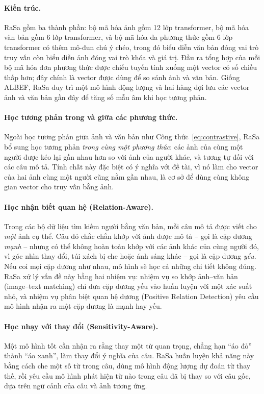 \paragraph{Kiến trúc.} RaSa gồm ba thành phần: bộ mã hóa ảnh gồm 12 lớp transformer, bộ mã hóa văn bản gồm 6 lớp transformer, và bộ mã hóa đa phương thức gồm 6 lớp transformer có thêm mô-đun chú ý chéo, trong đó biểu diễn văn bản đóng vai trò truy vấn còn biểu diễn ảnh đóng vai trò khóa và giá trị. Đầu ra tổng hợp của mỗi bộ mã hóa đơn phương thức được chiếu tuyến tính xuống một vector có số chiều thấp hơn; đây chính là vector được dùng để so sánh ảnh và văn bản. Giống ALBEF, RaSa duy trì một mô hình động lượng và hai hàng đợi lưu các vector ảnh và văn bản gần đây để tăng số mẫu âm khi học tương phản.

\paragraph{Học tương phản trong và giữa các phương thức.} Ngoài học tương phản giữa ảnh và văn bản như Công thức~\ref{eq:contrastive}, RaSa bổ sung học tương phản \emph{trong cùng một phương thức}: các ảnh của cùng một người được kéo lại gần nhau hơn so với ảnh của người khác, và tương tự đối với các câu mô tả. Tính chất này đặc biệt có ý nghĩa với đề tài, vì nó làm cho vector của hai ảnh cùng một người cũng nằm gần nhau, là cơ sở để dùng cùng không gian vector cho truy vấn bằng ảnh.

\paragraph{Học nhận biết quan hệ (Relation-Aware).} Trong các bộ dữ liệu tìm kiếm người bằng văn bản, mỗi câu mô tả được viết cho \emph{một} ảnh cụ thể. Câu đó chắc chắn khớp với ảnh được mô tả -- gọi là cặp dương \emph{mạnh} -- nhưng có thể không hoàn toàn khớp với các ảnh khác của cùng người đó, vì góc nhìn thay đổi, túi xách bị che hoặc ánh sáng khác -- gọi là cặp dương \emph{yếu}. Nếu coi mọi cặp dương như nhau, mô hình sẽ học cả những chi tiết không đúng. RaSa xử lý vấn đề này bằng hai nhiệm vụ: nhiệm vụ so khớp ảnh--văn bản (image--text matching) chỉ đưa cặp dương yếu vào huấn luyện với một xác suất nhỏ, và nhiệm vụ phân biệt quan hệ dương (Positive Relation Detection) yêu cầu mô hình nhận ra một cặp dương là mạnh hay yếu.

\paragraph{Học nhạy với thay đổi (Sensitivity-Aware).} Một mô hình tốt cần nhận ra rằng thay một từ quan trọng, chẳng hạn ``áo đỏ'' thành ``áo xanh'', làm thay đổi ý nghĩa của câu. RaSa huấn luyện khả năng này bằng cách che một số từ trong câu, dùng mô hình động lượng dự đoán từ thay thế, rồi yêu cầu mô hình phát hiện từ nào trong câu đã bị thay so với câu gốc, dựa trên ngữ cảnh của câu và ảnh tương ứng.

